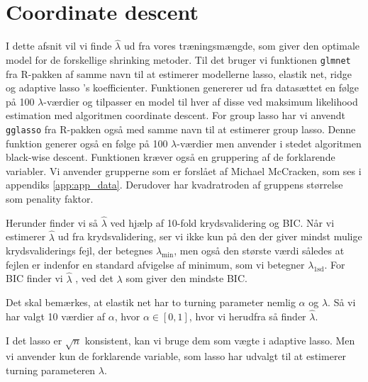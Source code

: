 \section{Coordinate descent}
I dette afsnit vil vi finde $\widehat\lambda$ ud fra vores træningsmængde, som giver den optimale model for de forskellige shrinking metoder. 
Til det bruger vi funktionen \texttt{glmnet} fra R-pakken af samme navn til at estimerer modellerne lasso, elastik net, ridge og adaptive lasso 's koefficienter. 
Funktionen genererer ud fra datasættet en følge på 100 $\lambda$-værdier og tilpasser en model til hver af disse ved maksimum likelihood estimation med algoritmen coordinate descent. 
For group lasso har vi anvendt \texttt{gglasso} fra R-pakken også med samme navn til at estimerer group lasso. 
Denne funktion generer også en følge på 100 $\lambda$-værdier men anvender i stedet algoritmen black-wise descent.  Funktionen kræver også en gruppering af de forklarende variabler. 
Vi anvender grupperne som er forslået af Michael McCracken, som ses i appendiks \ref{app:app_data}. Derudover har kvadratroden af gruppens størrelse som penality faktor. 

Herunder finder vi så  $\widehat\lambda$ ved hjælp af 10-fold krydsvalidering og BIC. 
Når vi estimerer $\widehat\lambda$ ud fra krydsvalidering, ser vi ikke kun på den der giver mindst mulige krydsvaliderings fejl, der betegnes $\lambda_{\min}$, men også den største værdi således at fejlen er indenfor en standard afvigelse af minimum, som vi betegner $\lambda_{\text{1sd}}$.  
For BIC finder vi $\widehat\lambda$ , ved det $\lambda$ som giver den mindste BIC. 

Det skal bemærkes, at elastik net har to turning parameter nemlig $\alpha$ og $\lambda$. 
Så vi har valgt 10 værdier af $\alpha$, hvor $\alpha \in [0,1]$, hvor vi herudfra så finder $\widehat\lambda$. 

I det lasso er $\sqrt{n}$ konsistent, kan vi bruge dem som vægte i adaptive lasso. 
Men vi anvender  kun de forklarende variable, som lasso har udvalgt til at estimerer turning parameteren $\lambda$. 

